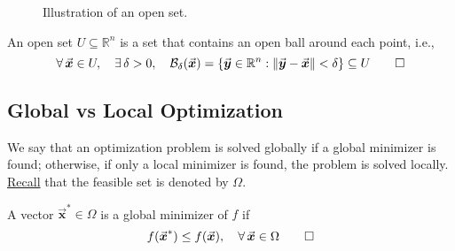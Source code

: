 \documentclass[9pt, headings=standardclasses, parskip=half]{scrartcl}
\renewcommand{\emph}[1]{\textcolor{mypurple}{#1}}
\newcommand{\vect}[1]{\vec{\boldsymbol{#1}}}
\begin{document}
\begin{figure}[h]
  \centering
  \caption*{Illustration of an open set.}
  \label{fig:open_set}
\end{figure}
\begin{definition}
An open set \(U\subseteq\mathbb{R}^{n}\) is a set that contains an open ball around each point, i.e.,
\[
\forall\, \vect{x}\in U, \quad \exists\, \delta>0, \quad \mathcal{B}_{\delta}(\vect{x})=\{ \vect{y}\in\mathbb{R}^{n} : \|\vect{y}-\vect{x}\|<\delta \} \subseteq U
\qedhere
\]
\end{definition}



\subsection{Global vs Local Optimization}\label{subsec:global_local_optimization}
We say that an optimization problem is solved globally if a \emph{global minimizer} is found; otherwise, if only a \emph{local minimizer} is found, the problem is solved locally. \hyperref[eq:feasible_set]{Recall} that the feasible set is denoted by \(\Omega\).

\begin{definition}\label{def:global_minimizer}
A vector \(\vect{x}^{*}\in\Omega\) is a \emph{global minimizer} of \(f\) if
\[
f(\vect{x}^{*})\leq f(\vect{x}),\quad \forall\, \vect{x}\in\Omega \qedhere
\]
\end{definition}
\end{document}
